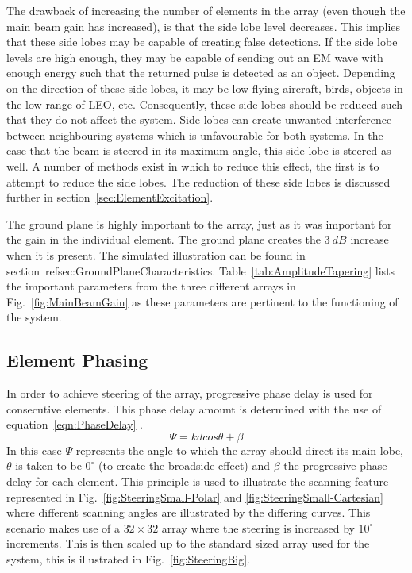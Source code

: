 \documentclass[11pt]{witseiepaper}
\begin{document}
\begin{bibunit}[witseie]
The drawback of increasing the number of elements in the array (even though the main beam gain has increased), is that the side lobe level decreases. This implies that these side lobes may be capable of creating false detections. If the side lobe levels are high enough, they may be capable of sending out an EM wave with enough energy such that the returned pulse is detected as an object. Depending on the direction of these side lobes, it may be low flying aircraft, birds, objects in the low range of LEO, etc. Consequently, these side lobes should be reduced such that they do not affect the system.
Side lobes can create unwanted interference between neighbouring systems which is unfavourable for both systems. In the case that the beam is steered in its maximum angle, this side lobe is steered as well. 
A number of methods exist in which to reduce this effect, the first is to attempt to reduce the side lobes.
The reduction of these side lobes is discussed further in section~\ref{sec:ElementExcitation}.

The ground plane is highly important to the array, just as it was important for the gain in the individual element. The ground plane creates the $3~dB$ increase when it is present. The simulated illustration can be found in section~ref{sec:GroundPlaneCharacteristics}.
Table~\ref{tab:AmplitudeTapering} lists the important parameters from the three different arrays in Fig.~\ref{fig:MainBeamGain} as these parameters are pertinent to the functioning of the system.

\subsection{Element Phasing} \label{sec:ElementPhasing}
In order to achieve steering of the array, progressive phase delay is used for consecutive elements. This phase delay amount is determined with the use of equation~\ref{eqn:PhaseDelay} \cite[p.~301]{Balanis}.
\begin{equation} \label{eqn:PhaseDelay}
\Psi = k d cos \theta + \beta
\end{equation}
In this case $\Psi$ represents the angle to which the array should direct its main lobe, $\theta$ is taken to be $0^{\circ}$ (to create the broadside effect) and $\beta$ the progressive phase delay for each element.
This principle is used to illustrate the scanning feature represented in Fig.~\ref{fig:SteeringSmall-Polar} and \ref{fig:SteeringSmall-Cartesian} where different scanning angles are illustrated by the differing curves. This scenario makes use of a $32 \times 32$ array where the steering is increased by $10^{\circ}$ increments. This is then scaled up to the standard sized array used for the system, this is illustrated in Fig.~\ref{fig:SteeringBig}.


\end{bibunit}
\end{document}
